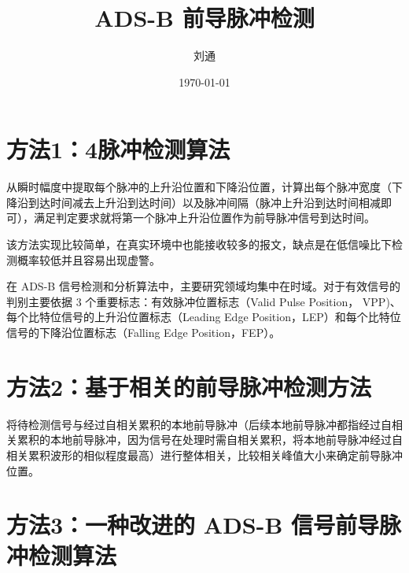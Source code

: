 \documentclass[UTF8, a4paper, 12pt]{ctexart}
\begin{document}
\title{\bfseries ADS-B 前导脉冲检测}
\author{刘通}
\date{\today}

\maketitle

\tableofcontents

\section{方法1：4脉冲检测算法}

从瞬时幅度中提取每个脉冲的上升沿位置和下降沿位置，计算出每个脉冲宽度（下降沿到达时间减去上升沿到达时间）以及脉冲间隔（脉冲上升沿到达时间相减即可），满足判定要求就将第一个脉冲上升沿位置作为前导脉冲信号到达时间。

该方法实现比较简单，在真实环境中也能接收较多的报文，缺点是在低信噪比下检测概率较低并且容易出现虚警。\cite{张建峰2017一种基于相关的}

在 ADS-B 信号检测和分析算法中，主要研究领域均集中在时域。对于有效信号的判别主要依据 3 个重要标志：有效脉冲位置标志（Valid Pulse Position，
VPP)、每个比特位信号的上升沿位置标志（Leading Edge Position，LEP）和每个比特位信号的下降沿位置标志（Falling Edge Position，FEP）。\cite{2013一种改进的}

\section{方法2：基于相关的前导脉冲检测方法}

将待检测信号与经过自相关累积的本地前导脉冲（后续本地前导脉冲都指经过自相关累积的本地前导脉冲，因为信号在处理时需自相关累积，将本地前导脉冲经过自相关累积波形的相似程度最高）进行整体相关，比较相关峰值大小来确定前导脉冲位置。\cite{张建峰2017一种基于相关的}

\section{方法3：一种改进的 ADS-B 信号前导脉冲检测算法}

\cite{2013一种改进的}



\end{document}
